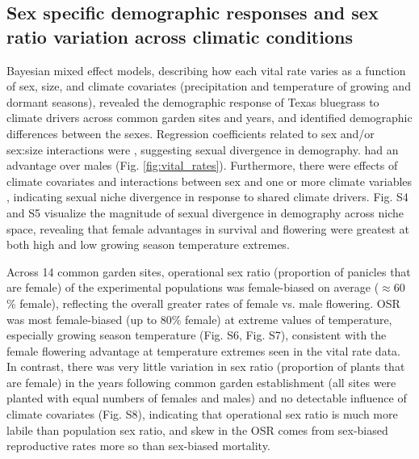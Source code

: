 \documentclass[9pt,twocolumn,twoside,lineno]{pnas-new}
\newcommand{\tom}[2]{{\color{red}{#1}}\footnote{\textit{\color{red}{#2}}}}
\newcommand{\revise}[1]{{\color{Mahogany}{#1}}}
\begin{document}
\subsection*{Sex specific demographic responses and sex ratio variation across climatic conditions}
Bayesian mixed effect models, describing how each vital rate varies as a function of sex, size, and climate covariates (precipitation and temperature of growing and dormant seasons), revealed the demographic response of Texas bluegrass to climate drivers across common garden sites and years, and identified demographic differences between the sexes. 
Regression coefficients related to sex and/or sex:size interactions were  \revise{consistently different from zero for survival, growth, and flowering ($Pr( coefficient  \lessgtr 0) > 0.75$, Fig. S3, Table S1)}, suggesting sexual divergence in demography. 
\revise{Particularly for survival and flowering, females} had an advantage over males (Fig. \ref{fig:vital_rates}).
Furthermore, there were \revise{strong} effects of climate covariates and interactions between sex and one or more climate variables \revise{(Fig. S3, Table S1)}, indicating sexual niche divergence in response to shared climate drivers.  
Fig. S4 and S5 visualize the magnitude of sexual divergence in demography across niche space, revealing that female advantages in survival and flowering were greatest at both high and low growing season temperature extremes. 

Across 14 common garden sites, operational sex ratio (proportion of panicles that are female) of the experimental populations was female-biased on average ($\approx 60$ \% female), reflecting the overall greater rates of female vs. male flowering. 
OSR was most female-biased (up to 80\% female) at extreme values of temperature, especially growing season temperature (Fig. S6, Fig. S7), consistent with the female flowering advantage at temperature extremes seen in the vital rate data. 
In contrast, there was very little variation in sex ratio (proportion of plants that are female) in the years following common garden establishment (all sites were planted with equal numbers of females and males) and no detectable influence of climate covariates (Fig. S8), indicating that operational sex ratio is much more labile than population sex ratio, and skew in the OSR comes from sex-biased reproductive rates more so than sex-biased mortality. 
\end{document}
